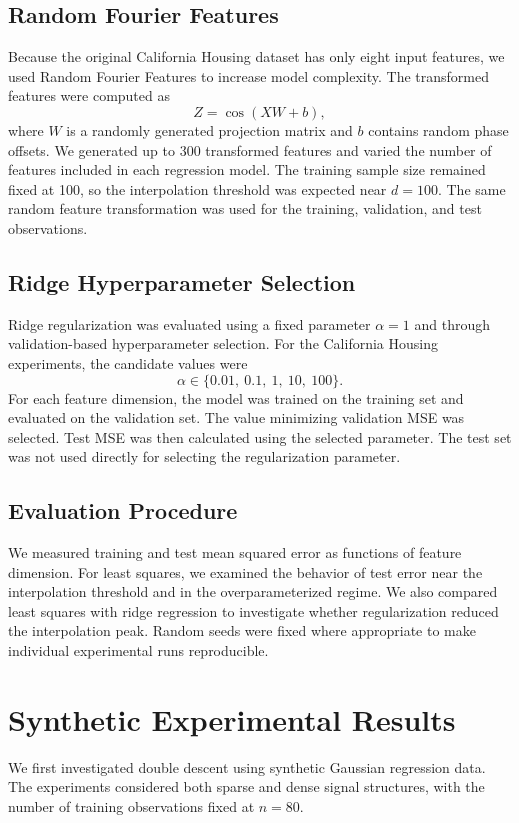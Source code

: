 \documentclass[11pt,a4paper]{article}
\begin{document}
\subsection{Random Fourier Features}
Because the original California Housing dataset
has only eight input features, we used Random
Fourier Features to increase model complexity.
The transformed features were computed as
\begin{equation}
    Z = \cos(XW+b),
\end{equation}
where $W$ is a randomly generated projection
matrix and $b$ contains random phase offsets.
We generated up to 300 transformed features
and varied the number of features included
in each regression model.
The training sample size remained fixed at 100,
so the interpolation threshold was expected
near $d=100$.
The same random feature transformation was
used for the training, validation, and
test observations.

\subsection{Ridge Hyperparameter Selection}
Ridge regularization was evaluated using
a fixed parameter $\alpha=1$ and through
validation-based hyperparameter selection.
For the California Housing experiments,
the candidate values were
\begin{equation}
    \alpha \in
    \{0.01,\ 0.1,\ 1,\ 10,\ 100\}.
\end{equation}
For each feature dimension, the model was
trained on the training set and evaluated
on the validation set.
The value minimizing validation MSE was
selected. Test MSE was then calculated
using the selected parameter.
The test set was not used directly
for selecting the regularization parameter.

\subsection{Evaluation Procedure}
We measured training and test mean squared
error as functions of feature dimension.
For least squares, we examined the behavior
of test error near the interpolation threshold
and in the overparameterized regime.
We also compared least squares with ridge
regression to investigate whether regularization
reduced the interpolation peak.
Random seeds were fixed where appropriate
to make individual experimental runs reproducible.

\section{Synthetic Experimental Results}
We first investigated double descent using synthetic
Gaussian regression data. The experiments considered
both sparse and dense signal structures, with the
number of training observations fixed at $n=80$.
\end{document}
